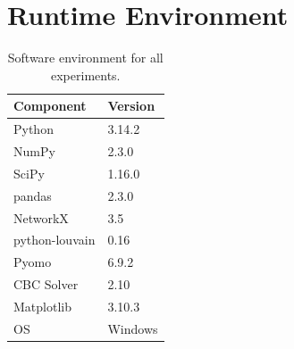 \section{Runtime Environment}
\label{app:runtime}

\begin{table}[h]
\centering
\caption{Software environment for all experiments.}
\label{tab:environment}
\small
\begin{tabular}{ll}
\toprule
\textbf{Component} & \textbf{Version} \\
\midrule
Python           & 3.14.2 \\
NumPy            & 2.3.0 \\
SciPy            & 1.16.0 \\
pandas           & 2.3.0 \\
NetworkX         & 3.5 \\
python-louvain   & 0.16 \\
Pyomo            & 6.9.2 \\
CBC Solver       & 2.10 \\
Matplotlib       & 3.10.3 \\
OS               & Windows \\
\bottomrule
\end{tabular}
\end{table}
